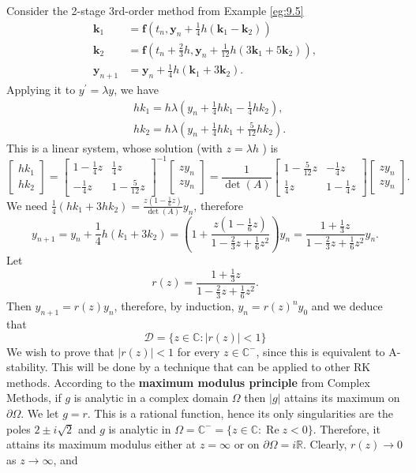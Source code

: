 \documentclass[a4paper]{article}
\begin{document}
\begin{example}
    Consider the 2-stage 3rd-order method from Example \ref{eg:9.5}
\[
\begin{aligned}
\mathbf{k}_1 & =\mathbf{f}\left(t_n, \mathbf{y}_n+\frac{1}{4} h\left(\mathbf{k}_1-\mathbf{k}_2\right)\right) \\
\mathbf{k}_2 & =\mathbf{f}\left(t_n+\frac{2}{3} h, \mathbf{y}_n+\frac{1}{12} h\left(3 \mathbf{k}_1+5 \mathbf{k}_2\right)\right), \\
\mathbf{y}_{n+1} & =\mathbf{y}_n+\frac{1}{4} h\left(\mathbf{k}_1+3 \mathbf{k}_2\right) .
\end{aligned}
\]
Applying it to $y^{\prime}=\lambda y$, we have
\[
\begin{aligned}
& h k_1=h \lambda\left(y_n+\frac{1}{4} h k_1-\frac{1}{4} h k_2\right), \\
& h k_2=h \lambda\left(y_n+\frac{1}{4} h k_1+\frac{5}{12} h k_2\right) .
\end{aligned}
\]
This is a linear system, whose solution (with $z=\lambda h$ ) is
\[
\begin{bmatrix}
    h k_1 \\
h k_2
\end{bmatrix}=
\begin{bmatrix}
    1-\frac{1}{4} z & \frac{1}{4} z \\
-\frac{1}{4} z & 1-\frac{5}{12} z
\end{bmatrix}^{-1}
\begin{bmatrix}
    z y_n \\
z y_n
\end{bmatrix}=\frac{1}{\det(A)}
\begin{bmatrix}
    1-\frac{5}{12} z & -\frac{1}{4} z \\
\frac{1}{4} z & 1-\frac{1}{4} z
\end{bmatrix}
\begin{bmatrix}
    z y_n \\
z y_n
\end{bmatrix}.
\]
We need $\frac{1}{4}\left(h k_1+3 h k_2\right)=\frac{z\left(1-\frac{1}{6} z\right)}{\det(A)} y_n$, therefore
\[
y_{n+1}=y_n+\frac{1}{4} h\left(k_1+3 k_2\right)=\left(1+\frac{z\left(1-\frac{1}{6} z\right)}{1-\frac{2}{3} z+\frac{1}{6} z^2}\right) y_n=\frac{1+\frac{1}{3} z}{1-\frac{2}{3} z+\frac{1}{6} z^2} y_n .
\]
Let
\[
r(z)=\frac{1+\frac{1}{3} z}{1-\frac{2}{3} z+\frac{1}{6} z^2} .
\]
Then $y_{n+1}=r(z) y_n$, therefore, by induction, $y_n=r(z)^n y_0$ and we deduce that
\[
\mathcal{D}=\{z \in \mathbb{C}:|r(z)|<1\}
\]
We wish to prove that $|r(z)|<1$ for every $z \in \mathbb{C}^{-}$, since this is equivalent to A-stability. This will be done by a technique that can be applied to other RK methods. According to the \textbf{maximum modulus principle} from Complex Methods, if $g$ is analytic in a complex domain $\Omega$ then $|g|$ attains its maximum on $\partial \Omega$. We let $g=r$. This is a rational function, hence its only singularities are the poles $2 \pm i \sqrt{2}$ and $g$ is analytic in $\Omega=\mathbb{C}^{-}=\{z \in \mathbb{C}: \operatorname{Re} z<0\}$. Therefore, it attains its maximum modulus either at $z=\infty$ or on $\partial \Omega=i \mathbb{R}$. Clearly, $r(z) \rightarrow 0$ as $z \rightarrow \infty$, and

\end{example}
\end{document}
